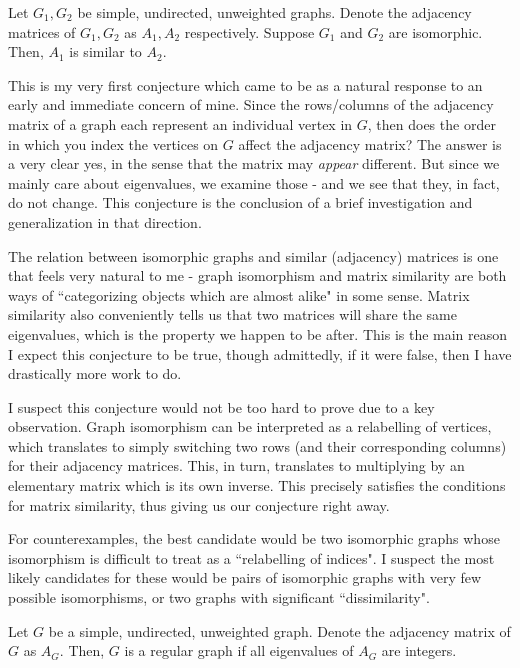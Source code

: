 \documentclass{article}
\begin{document}

\begin{mylm}[type=Conjecture 1]
Let $ G_{1}, G_{2} $ be simple, undirected, unweighted graphs. Denote the adjacency matrices of $ G_{1}, G_{2} $ as $ A_{1}, A_{2} $ respectively. \vsp
Suppose $ G_{1} $ and $ G_{2} $ are isomorphic. Then, $ A_{1} $ is similar to $ A_{2} $.
\end{mylm}
This is my very first conjecture which came to be as a natural response to an early and immediate concern of mine.
Since the rows/columns of the adjacency matrix of a graph each represent an individual vertex in $ G $, then does the order in which you index the vertices on $ G $ affect the adjacency matrix? \vsp
The answer is a very clear yes, in the sense that the matrix may \textit{appear} different.
But since we mainly care about eigenvalues, we examine those - and we see that they, in fact, do not change.
This conjecture is the conclusion of a brief investigation and generalization in that direction. \npgh

The relation between isomorphic graphs and similar (adjacency) matrices is one that feels very natural to me - graph isomorphism and matrix similarity are both ways of ``categorizing objects which are almost alike" in some sense.
Matrix similarity also conveniently tells us that two matrices will share the same eigenvalues, which is the property we happen to be after.
This is the main reason I expect this conjecture to be true, though admittedly, if it were false, then I have drastically more work to do. \npgh

I suspect this conjecture would not be too hard to prove due to a key observation.
Graph isomorphism can be interpreted as a relabelling of vertices, which translates to simply switching two rows (and their corresponding columns) for their adjacency matrices.
This, in turn, translates to multiplying by an elementary matrix which is its own inverse. This precisely satisfies the conditions for matrix similarity, thus giving us our conjecture right away. \npgh

For counterexamples, the best candidate would be two isomorphic graphs whose isomorphism is difficult to treat as a ``relabelling of indices".
I suspect the most likely candidates for these would be pairs of isomorphic graphs with very few possible isomorphisms, or two graphs with significant ``dissimilarity".

\newpage
\begin{mylm}[type=Conjecture 2]
Let $ G $ be a simple, undirected, unweighted graph. Denote the adjacency matrix of $ G $ as $ A_{G} $. \vsp
Then, $ G $ is a regular graph if all eigenvalues of $ A_{G} $ are integers.
\end{mylm}
\end{document}
